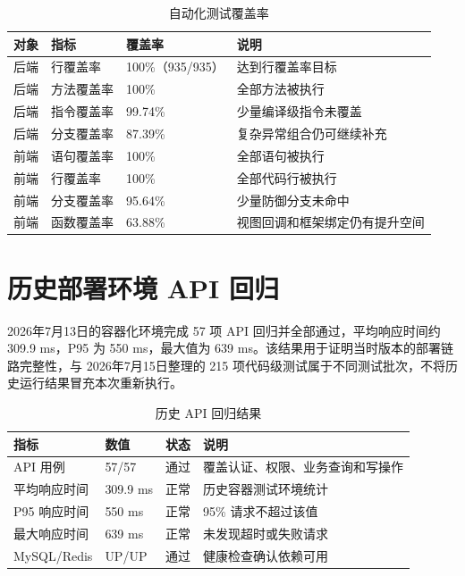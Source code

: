 \documentclass[UTF8,a4paper,12pt,openany,fontset=windows]{ctexrep}
\begin{document}
\begin{table}[H]
  \centering
  \caption{自动化测试覆盖率}
  \begin{tabularx}{\textwidth}{p{3.0cm}p{3.0cm}p{2.6cm}L}
    \toprule
    对象 & 指标 & 覆盖率 & 说明 \\
    \midrule
    后端 & 行覆盖率 & 100\%（935/935） & 达到行覆盖率目标 \\
    后端 & 方法覆盖率 & 100\% & 全部方法被执行 \\
    后端 & 指令覆盖率 & 99.74\% & 少量编译级指令未覆盖 \\
    后端 & 分支覆盖率 & 87.39\% & 复杂异常组合仍可继续补充 \\
    前端 & 语句覆盖率 & 100\% & 全部语句被执行 \\
    前端 & 行覆盖率 & 100\% & 全部代码行被执行 \\
    前端 & 分支覆盖率 & 95.64\% & 少量防御分支未命中 \\
    前端 & 函数覆盖率 & 63.88\% & 视图回调和框架绑定仍有提升空间 \\
    \bottomrule
  \end{tabularx}
\end{table}

\section{历史部署环境 API 回归}

2026年7月13日的容器化环境完成 57 项 API 回归并全部通过，平均响应时间约 309.9 ms，P95 为 550 ms，最大值为 639 ms。该结果用于证明当时版本的部署链路完整性，与 2026年7月15日整理的 215 项代码级测试属于不同测试批次，不将历史运行结果冒充本次重新执行。

\begin{table}[H]
  \centering
  \caption{历史 API 回归结果}
  \begin{tabularx}{\textwidth}{p{3.1cm}p{2.6cm}p{2.6cm}L}
    \toprule
    指标 & 数值 & 状态 & 说明 \\
    \midrule
    API 用例 & 57/57 & 通过 & 覆盖认证、权限、业务查询和写操作 \\
    平均响应时间 & 309.9 ms & 正常 & 历史容器测试环境统计 \\
    P95 响应时间 & 550 ms & 正常 & 95\% 请求不超过该值 \\
    最大响应时间 & 639 ms & 正常 & 未发现超时或失败请求 \\
    MySQL/Redis & UP/UP & 通过 & 健康检查确认依赖可用 \\
    \bottomrule
  \end{tabularx}
\end{table}
\end{document}
